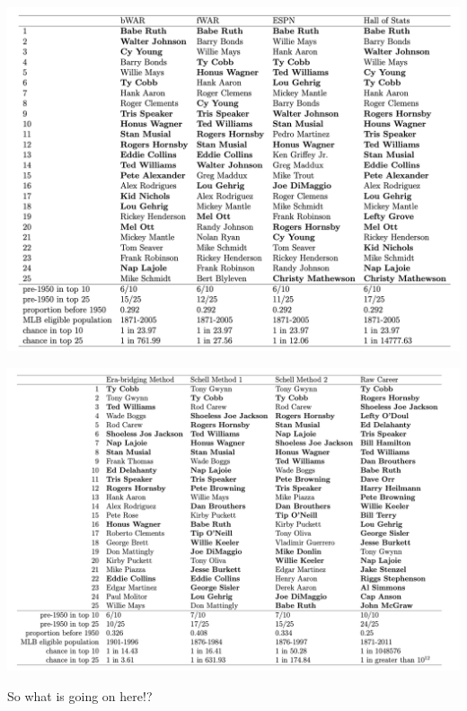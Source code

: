 \documentclass[
  ignorenonframetext,
]{beamer}
\begin{document}
\begin{frame}{}
\protect\hypertarget{section-3}{}
\includegraphics{other_career_rankers.png}
\end{frame}

\begin{frame}{}
\protect\hypertarget{section-4}{}
\includegraphics{other_methods_new.png}
\end{frame}

\begin{frame}{}
\protect\hypertarget{section-5}{}
\begin{center}
So what is going on here!?
\end{center}
\end{frame}
\end{document}
